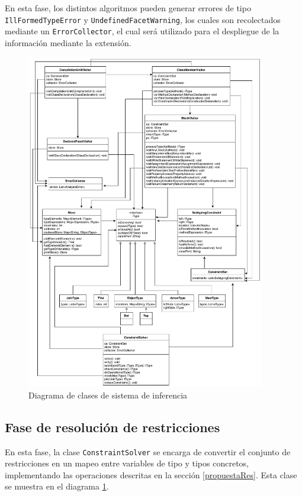 En esta fase, los distintos algoritmos pueden generar errores de tipo \texttt{IllFormedTypeError} y \texttt{UndefinedFacetWarning}, los cuales son recolectados mediante un \texttt{ErrorCollector}, el cual será utilizado para el despliegue de la información mediante la extensión.
\clearpage
\begin{figure}[ht]
  \centering
  \includegraphics[width=0.93\textwidth]{imagenes/others.pdf}
  \caption{Diagrama de clases de sistema de inferencia}
  \label{uml}
\end{figure}
\clearpage
\subsection{Fase de resolución de restricciones}
En esta fase, la clase \texttt{ConstraintSolver} se encarga de convertir el conjunto de restricciones en un mapeo entre variables de tipo y tipos concretos, implementando las operaciones descritas en la sección \ref{propuestaRes}. Esta clase se muestra en el diagrama \ref{uml}.

